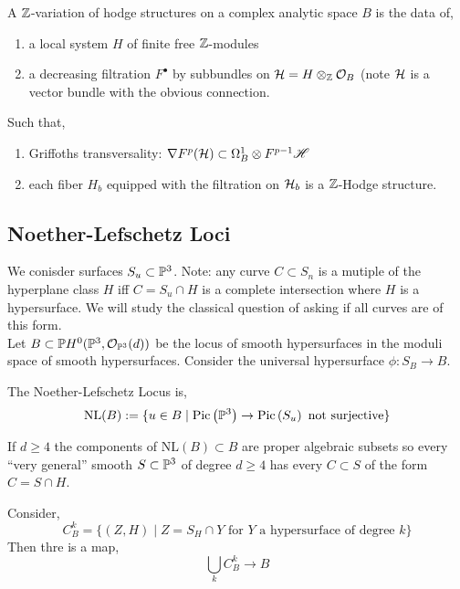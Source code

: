 \documentclass[12pt]{article}
\begin{document}
\begin{defn}
A $\Z$-variation of hodge structures on a complex analytic space $B$ is the data of,
\begin{enumerate}
\item a local system $H$ of finite free $\Z$-modules

\item a decreasing filtration $F^\bullet$ by subbundles on $\cH = H \ot_{\Z} \struct{B}$ (note $\cH$ is a vector bundle with the obvious connection.
\end{enumerate}
Such that,
\begin{enumerate}
\item Griffoths transversality: $\nabla F^p (\cH) \subset \Omega_B^1 \ot F^{p-1} \H$
\item each fiber $H_b$ equipped with the filtration on $\cH_b$ is a $\Z$-Hodge structure. 
\end{enumerate}
\end{defn}

\subsection{Noether-Lefschetz Loci}

We conisder surfaces $S_u \subset \P^3$. Note: any curve $C \subset S_n$ is a mutiple of the hyperplane class $H$ iff $C = S_u \cap H$ is a complete intersection where $H$ is a hypersurface. We will study the classical question of asking if all curves are of this form. 
\bigskip\\
Let $B \subset \P H^0(\P^3, \struct{\P^3}(d))$ be the locus of smooth hypersurfaces in the moduli space of smooth hypersurfaces. Consider the universal hypersurface $\phi : S_B \to B$. 

\newcommand{\NL}{\mathrm{NL}}

\begin{defn}
The Noether-Lefschetz Locus is,
\[ \NL(B) := \{ u \in B \mid \Pic{\P^3} \to \Pic{S_u} \text{ not surjective} \} \]
\end{defn}

\begin{theorem}
If $d \ge 4$ the components of $\NL(B) \subset B$ are proper algebraic subsets so every ``very general'' smooth $S \subset \P^3$ of degree $d \ge 4$ has every $C \subset S$ of the form $C = S \cap H$. 
\end{theorem}

\begin{rmk}
Consider,
\[ C^k_B = \{ (Z,H) \mid Z = S_H \cap Y \text{ for } Y \text{ a hypersurface of degree } k \} \]
Then thre is a map,
\[ \bigcup_k C^k_B \to B \]

\end{rmk}
\end{document}
